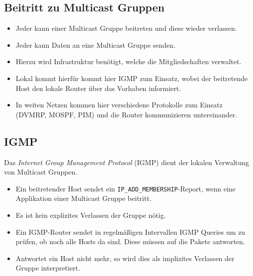         \subsection{Beitritt zu Multicast Gruppen}
            \begin{itemize}
            	\item Jeder kann einer Multicast Gruppe beitreten und diese wieder verlassen.
            	\item Jeder kann Daten an eine Multicast Gruppe senden.
            	\item Hierzu wird Infrastruktur benötigt, welche die Mitgliedschaften verwaltet.
            	\item Lokal kommt hierfür kommt hier IGMP zum Einsatz, wobei der beitretende Host den lokale Router über das Vorhaben informiert.
            	\item In weiten Netzen kommen hier verschiedene Protokolle zum Einsatz (DVMRP, MOSPF, PIM) und die Router kommunizieren untereinander.
            \end{itemize}

        \subsection{IGMP}
            Das \textit{Internet Group Management Protocol} (IGMP) dient der lokalen Verwaltung von Multicast Gruppen.
            \begin{itemize}
            	\item Ein beitretender Host sendet ein \texttt{IP\_ADD\_MEMBERSHIP}-Report, wenn eine Applikation einer Multicast Gruppe beitritt.
	            \item Es ist kein explizites Verlassen der Gruppe nötig.
	            \item Ein IGMP-Router sendet in regelmäßigen Intervallen IGMP Queries um zu prüfen, ob noch alle Hosts da sind. Diese müssen auf die Pakete antworten.
	            \item Antwortet ein Host nicht mehr, so wird dies als implizites Verlassen der Gruppe interpretiert.
            \end{itemize}

